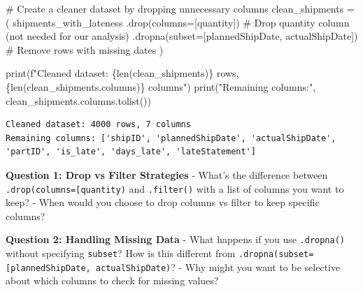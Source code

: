 \documentclass[
  letterpaper,
  DIV=11,
  numbers=noendperiod]{scrartcl}
\newenvironment{Shaded}{\begin{snugshade}}{\end{snugshade}}
\newcommand{\BuiltInTok}[1]{\textcolor[rgb]{0.00,0.23,0.31}{#1}}
\newcommand{\CommentTok}[1]{\textcolor[rgb]{0.37,0.37,0.37}{#1}}
\newcommand{\NormalTok}[1]{\textcolor[rgb]{0.00,0.23,0.31}{#1}}
\newcommand{\OperatorTok}[1]{\textcolor[rgb]{0.37,0.37,0.37}{#1}}
\newcommand{\SpecialCharTok}[1]{\textcolor[rgb]{0.37,0.37,0.37}{#1}}
\newcommand{\SpecialStringTok}[1]{\textcolor[rgb]{0.13,0.47,0.30}{#1}}
\newcommand{\StringTok}[1]{\textcolor[rgb]{0.13,0.47,0.30}{#1}}
\begin{document}
\label{mental-model-3-drop}
\begin{Shaded}
\begin{Highlighting}[]
\CommentTok{\# Create a cleaner dataset by dropping unnecessary columns}
\NormalTok{clean\_shipments }\OperatorTok{=}\NormalTok{ (}
\NormalTok{    shipments\_with\_lateness}
\NormalTok{    .drop(columns}\OperatorTok{=}\NormalTok{[}\StringTok{\textquotesingle{}quantity\textquotesingle{}}\NormalTok{])  }\CommentTok{\# Drop quantity column (not needed for our analysis)}
\NormalTok{    .dropna(subset}\OperatorTok{=}\NormalTok{[}\StringTok{\textquotesingle{}plannedShipDate\textquotesingle{}}\NormalTok{, }\StringTok{\textquotesingle{}actualShipDate\textquotesingle{}}\NormalTok{])  }\CommentTok{\# Remove rows with missing dates}
\NormalTok{)}

\BuiltInTok{print}\NormalTok{(}\SpecialStringTok{f"Cleaned dataset: }\SpecialCharTok{\{}\BuiltInTok{len}\NormalTok{(clean\_shipments)}\SpecialCharTok{\}}\SpecialStringTok{ rows, }\SpecialCharTok{\{}\BuiltInTok{len}\NormalTok{(clean\_shipments.columns)}\SpecialCharTok{\}}\SpecialStringTok{ columns"}\NormalTok{)}
\BuiltInTok{print}\NormalTok{(}\StringTok{"Remaining columns:"}\NormalTok{, clean\_shipments.columns.tolist())}
\end{Highlighting}
\end{Shaded}

\begin{verbatim}
Cleaned dataset: 4000 rows, 7 columns
Remaining columns: ['shipID', 'plannedShipDate', 'actualShipDate', 'partID', 'is_late', 'days_late', 'lateStatement']
\end{verbatim}

\begin{tcolorbox}[enhanced jigsaw, toptitle=1mm, opacityback=0, colframe=quarto-callout-important-color-frame, leftrule=.75mm, arc=.35mm, opacitybacktitle=0.6, breakable, titlerule=0mm, coltitle=black, bottomtitle=1mm, title=\textcolor{quarto-callout-important-color}{\faExclamation}\hspace{0.5em}{🤔 Discussion Questions: Drop Mental Model}, colbacktitle=quarto-callout-important-color!10!white, rightrule=.15mm, left=2mm, bottomrule=.15mm, toprule=.15mm, colback=white]

\textbf{Question 1: Drop vs Filter Strategies} - What's the difference
between
\texttt{.drop(columns={[}\textquotesingle{}quantity\textquotesingle{}{]})}
and \texttt{.filter()} with a list of columns you want to keep? - When
would you choose to drop columns vs filter to keep specific columns?

\textbf{Question 2: Handling Missing Data} - What happens if you use
\texttt{.dropna()} without specifying \texttt{subset}? How is this
different from
\texttt{.dropna(subset={[}\textquotesingle{}plannedShipDate\textquotesingle{},\ \textquotesingle{}actualShipDate\textquotesingle{}{]})}?
- Why might you want to be selective about which columns to check for
missing values?

\end{tcolorbox}
\end{document}
